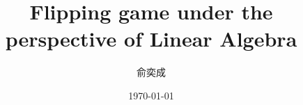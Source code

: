 \documentclass[UTF-8,a4paper]{ctexart}
\begin{document}
\title{Flipping game under the perspective of Linear Algebra}
\author{\kaishu 俞奕成}
\date{\kaishu \today}
\maketitle
\setcounter{tocdepth}{2}
\tableofcontents
\end{document}
